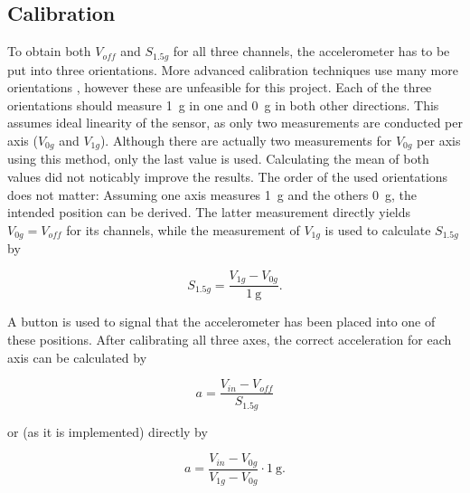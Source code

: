 \documentclass[a4paper, 12pt]{article}
\begin{document}
\subsection{Calibration} \label{sec:calibration}
To obtain both $V_{off}$ and $S_{1.5g}$ for all three channels, the accelerometer has to be put into three orientations. More advanced calibration techniques use many more orientations \cite{Sipos2012}, however these are unfeasible for this project. Each of the three orientations should measure \SI{+1}{\gram} in one and \SI{0}{\gram} in both other directions. This assumes ideal linearity of the sensor, as only two measurements are conducted per axis ($V_{0g}$ and $V_{1g}$). Although there are actually two measurements for $V_{0g}$ per axis using this method, only the last value is used. Calculating the mean of both values did not noticably improve the results. The order of the used orientations does not matter: Assuming one axis measures \SI{+1}{\gram} and the others \SI{0}{\gram}, the intended position can be derived. The latter measurement directly yields $V_{0g} = V_{off}$ for its channels, while the measurement of $V_{1g}$ is used to calculate $S_{1.5g}$ by

\begin{equation}
	S_{1.5g} = \frac{V_{1g} - V_{0g}}{\SI{1}{\gram}}.
\end{equation}

A button is used to signal that the accelerometer has been placed into one of these positions. After calibrating all three axes, the correct acceleration for each axis can be calculated by

\begin{equation}
	a = \frac{V_{in} - V_{off}}{S_{1.5g}}
\end{equation}

or (as it is implemented) directly by

\begin{equation}
	a = \frac{V_{in} - V_{0g}}{V_{1g} - V_{0g}} \cdot \SI{1}{\gram}.
\end{equation}
\end{document}
